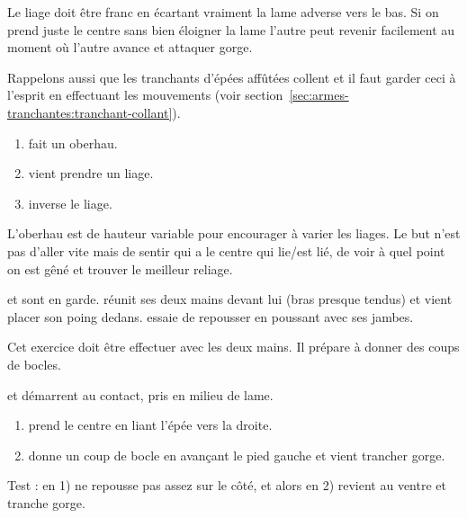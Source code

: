 Le liage doit être franc en écartant vraiment la lame adverse vers le bas.
Si on prend juste le centre sans bien éloigner la lame l'autre peut revenir facilement au moment où l'autre avance et attaquer gorge.

Rappelons aussi que les tranchants d'épées affûtées collent et il faut garder ceci à l'esprit en effectuant les mouvements (voir section~\ref{sec:armes-tranchantes:tranchant-collant}).


\begin{exercice}[Liages]

\begin{enumerate}
	\item \A fait un oberhau.
	\item \D vient prendre un liage.
	\item \A inverse le liage.
\end{enumerate}

L'oberhau est de hauteur variable pour encourager \D à varier les liages.
Le but n'est pas d'aller vite mais de sentir qui a le centre qui lie/est lié, de voir à quel point on est gêné et trouver le meilleur reliage.
\end{exercice}


\begin{exercice}
\A et \D sont en garde.
\D réunit ses deux mains devant lui (bras presque tendus) et \A vient placer son poing dedans.
\A essaie de repousser \D en poussant avec ses jambes.

Cet exercice doit être effectuer avec les deux mains.
Il prépare à donner des coups de bocles.

\end{exercice}


\begin{technique}

\A et \D démarrent au contact, pris en milieu de lame.

\begin{enumerate}
	\item \A prend le centre en liant l'épée vers la droite.
	\item \A donne un coup de bocle en avançant le pied gauche et vient trancher gorge.
\end{enumerate}

Test : en 1) \A ne repousse pas assez sur le côté, et alors en 2) \D revient au ventre et tranche gorge.

\end{technique}


